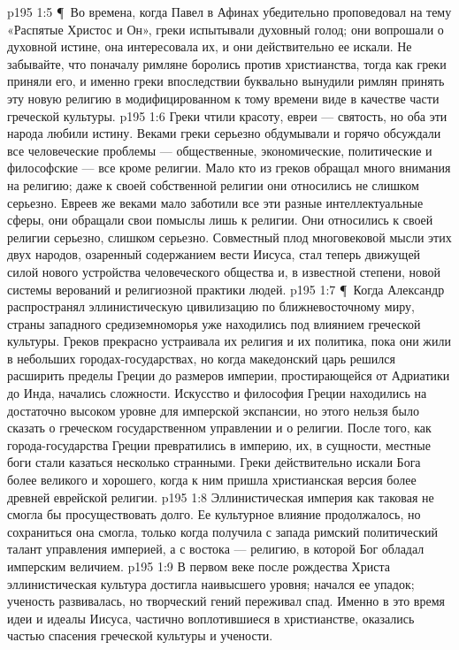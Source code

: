 \vs p195 1:5 \P\ Во времена, когда Павел в Афинах убедительно проповедовал на тему «Распятые Христос и Он», греки испытывали духовный голод; они вопрошали о духовной истине, она интересовала их, и они действительно ее искали. Не забывайте, что поначалу римляне боролись против христианства, тогда как греки приняли его, и именно греки впоследствии буквально вынудили римлян принять эту новую религию в модифицированном к тому времени виде в качестве части греческой культуры.
\vs p195 1:6 Греки чтили красоту, евреи --- святость, но оба эти народа любили истину. Веками греки серьезно обдумывали и горячо обсуждали все человеческие проблемы --- общественные, экономические, политические и философские --- все кроме религии. Мало кто из греков обращал много внимания на религию; даже к своей собственной религии они относились не слишком серьезно. Евреев же веками мало заботили все эти разные интеллектуальные сферы, они обращали свои помыслы лишь к религии. Они относились к своей религии серьезно, слишком серьезно. Совместный плод многовековой мысли этих двух народов, озаренный содержанием вести Иисуса, стал теперь движущей силой нового устройства человеческого общества и, в известной степени, новой системы верований и религиозной практики людей.
\vs p195 1:7 \P\ Когда Александр распространял эллинистическую цивилизацию по ближневосточному миру, страны западного средиземноморья уже находились под влиянием греческой культуры. Греков прекрасно устраивала их религия и их политика, пока они жили в небольших городах\hyp{}государствах, но когда македонский царь решился расширить пределы Греции до размеров империи, простирающейся от Адриатики до Инда, начались сложности. Искусство и философия Греции находились на достаточно высоком уровне для имперской экспансии, но этого нельзя было сказать о греческом государственном управлении и о религии. После того, как города\hyp{}государства Греции превратились в империю, их, в сущности, местные боги стали казаться несколько странными. Греки действительно искали  Бога более великого и хорошего, когда к ним пришла христианская версия более древней еврейской религии.
\vs p195 1:8 Эллинистическая империя как таковая не смогла бы просуществовать долго. Ее культурное влияние продолжалось, но сохраниться она смогла, только когда получила с запада римский политический талант управления империей, а с востока --- религию, в которой Бог обладал имперским величием.
\vs p195 1:9 В первом веке после рождества Христа эллинистическая культура достигла наивысшего уровня; начался ее упадок; ученость развивалась, но творческий гений переживал спад. Именно в это время идеи и идеалы Иисуса, частично воплотившиеся в христианстве, оказались частью спасения греческой культуры и учености.
